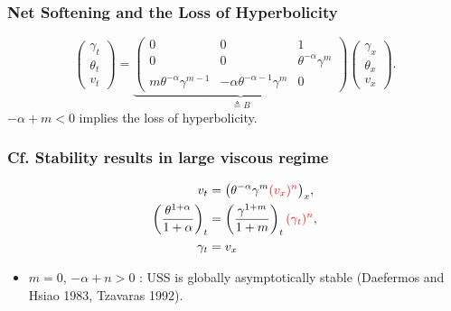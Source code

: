 \documentclass{beamer}
\def\red{\color{red}}
\def\blue{\color{blue}}
\begin{document}
\begin{frame}
 \frametitle{Net Softening and the Loss of Hyperbolicity}
\begin{equation} \label{eq:transport}
 \begin{pmatrix} \gamma_t \\ \theta_t \\ v_t \end{pmatrix} = \underbrace{
 \begin{pmatrix}
  0 & 0 & 1\\
  0 & 0 & \theta^{-\alpha}\gamma^m \\
  m\theta^{-\alpha}\gamma^{m-1} & -\alpha\theta^{-\alpha-1}\gamma^m & 0\end{pmatrix}}_\text{$\triangleq B$}
  \begin{pmatrix} \gamma_x \\ \theta_x \\ v_x \end{pmatrix}. 
\end{equation}
\vfill
$-\alpha+m<0$ implies the loss of hyperbolicity.
\end{frame}

\begin{frame}
 \frametitle{Cf. Stability results in large viscous regime}
 \begin{align*}
  v_t &= \big(\theta^{-\alpha}\gamma^m {\red (v_x)^n}\big)_x,\\
  \left(\frac{\theta^{1+\alpha}}{1+\alpha}\right)_t &= \left(\frac{\gamma^{1+m}}{1+m}\right)_t{\red (\gamma_t)^n},\\
  \gamma_t&=v_x
 \end{align*}
 \begin{itemize}
  \item $m=0$, $-\alpha+n>0$ :  USS is globally asymptotically stable {\footnotesize (Daefermos and Hsiao 1983, Tzavaras 1992)}.
 \end{itemize}

  
  \vfill
\end{frame}
\end{document}
